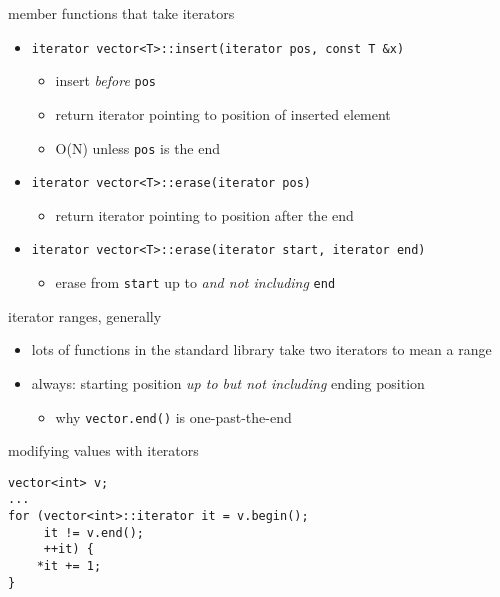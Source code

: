 \begin{frame}[fragile,label=moreItMethods]{member functions that take iterators}
\lstset{
    language=C++,
    style=smaller
}
\begin{itemize}
\item \lstinline|iterator vector<T>::insert(iterator pos, const T &x)|
\begin{itemize}
    \item insert \textit{before} \texttt{pos}
    \item return iterator pointing to position of inserted element
    \item O(N) unless \texttt{pos} is the end
\end{itemize}
\item \lstinline|iterator vector<T>::erase(iterator pos)| 
    \begin{itemize}
    \item return iterator pointing to position after the end
    \end{itemize}
\item \lstinline|iterator vector<T>::erase(iterator start, iterator end)| 
    \begin{itemize}
        \item erase from \texttt{start} up to \textit{and not including} \texttt{end}
    \end{itemize}
\end{itemize}
\end{frame}

\begin{frame}{iterator ranges, generally}
\begin{itemize}
    \item lots of functions in the standard library take two iterators to mean a range
    \item always: starting position \textit{up to but not including} ending position
        \begin{itemize}
        \item why {\tt vector.end()} is one-past-the-end
        \end{itemize}
\end{itemize}
\end{frame}

\begin{frame}[fragile,label=modWithIt]{modifying values with iterators}
\lstset{language=C++,style=small}
\begin{lstlisting}
vector<int> v;
...
for (vector<int>::iterator it = v.begin();
     it != v.end();
     ++it) {
    *it += 1;
}
\end{lstlisting}
\end{frame}

